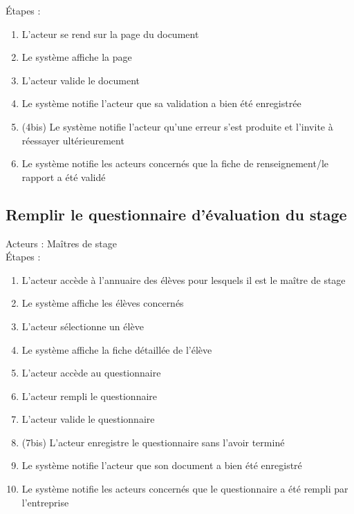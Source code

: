 \documentclass{scrreprt}
\begin{document}
\'Etapes : 
\begin{enumerate}
\item L’acteur se rend sur la page du document
\item Le système affiche la page
\item L’acteur valide le document
\item Le système notifie l’acteur que sa validation a bien été enregistrée
\item (4bis) Le système notifie l’acteur qu’une erreur s’est produite et l’invite à réessayer ultérieurement
\item Le système notifie les acteurs concernés que la fiche de renseignement/le rapport a été validé
\end{enumerate}

\newpage
\subsection{Remplir le questionnaire d’\'evaluation du stage}
Acteurs : Ma\^itres de stage 
\\
\'Etapes : 
\begin{enumerate}
\item L’acteur acc\`ede \`a l’annuaire des \'el\`eves pour lesquels il est le ma\^itre de stage
\item Le syst\`eme affiche les \'el\`eves concern\'es
\item L’acteur s\'electionne un \'el\`eve
\item Le syst\`eme affiche la fiche d\'etaill\'ee de l’\'el\`eve
\item L’acteur acc\`ede au questionnaire 
\item L’acteur rempli le questionnaire 
\item L’acteur valide le questionnaire
\item (7bis) L’acteur enregistre le questionnaire sans l’avoir termin\'e
\item Le syst\`eme notifie l’acteur que son document a bien \'et\'e enregistr\'e
\item Le syst\`eme notifie les acteurs concern\'es que le questionnaire a \'et\'e rempli par l’entreprise
\end{enumerate}
\end{document}
